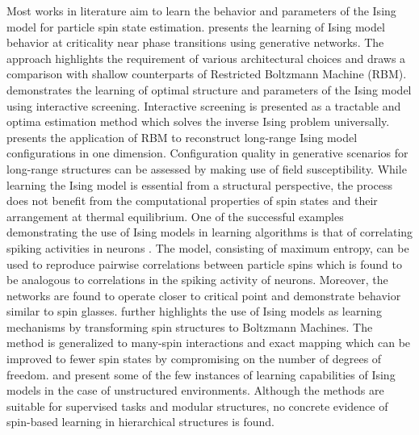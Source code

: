 \documentclass{article}
\begin{document}
Most works in literature aim to learn the behavior \cite{learn-critic} and parameters \cite{learn-param} of the Ising model for particle spin state estimation. \cite{learn-critic} presents the learning of Ising model behavior at criticality near phase transitions using generative networks. The approach highlights the requirement of various architectural choices and draws a comparison with shallow counterparts of Restricted Boltzmann Machine (RBM). \cite{learn-param} demonstrates the learning of optimal structure and parameters of the Ising model using interactive screening. Interactive screening is presented as a tractable and optima estimation method which solves the inverse Ising problem universally. \cite{rbm} presents the application of RBM to reconstruct long-range Ising model configurations in one dimension. Configuration quality in generative scenarios for long-range structures can be assessed by making use of field susceptibility. While learning the Ising model is essential from a structural perspective, the process does not benefit from the computational properties of spin states \cite{real} and their arrangement at thermal equilibrium. One of the successful examples demonstrating the use of Ising models in learning algorithms is that of correlating spiking activities in neurons \cite{real}. The model, consisting of maximum entropy, can be used to reproduce pairwise correlations between particle spins which is found to be analogous to correlations in the spiking activity of neurons. Moreover, the networks are found to operate closer to critical point and demonstrate behavior similar to spin glasses. \cite{transform} further highlights the use of Ising models as learning mechanisms by transforming spin structures to Boltzmann Machines. The method is generalized to many-spin interactions and exact mapping which can be improved to fewer spin states by compromising on the number of degrees of freedom. \cite{real} and \cite{transform} present some of the few instances of learning capabilities of Ising models in the case of unstructured environments. Although the methods are suitable for supervised tasks and modular structures, no concrete evidence of spin-based learning in hierarchical structures is found. 
\end{document}
